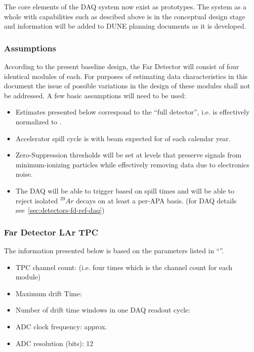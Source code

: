 The core elements of the DAQ system now exist as prototypes.
The system as a whole with capabilities such as descibed above is
in the conceptual design stage and information will be added to DUNE planning documents as it is developed.





\subsubsection{Assumptions}
\label{sec:detectors-sc-infrastructure-assumptions}
According to the present baseline design, the Far Detector will
consist of four identical modules of \tpcmodulemass each.  For
purposes of estimating data characteristics in this document the issue
of possible variations in the design of these modules shall not be
addressed. A few basic assumptions will need to be used:
\begin{itemize}
\item Estimates presented below correspond to the ``full detector'',
  i.e. is effectively normalized to \dunedetectormass.
\item Accelerator spill cycle is \beamspillcycle with beam expected
  for \beamrunfraction of each calendar year.
\item Zero-Suppression thresholds will be set at levels that preserve
  signals from minimum-ionizing particles while effectively removing
  data due to electronics noise.
\item The DAQ will be able to trigger based on spill times and will be
  able to reject isolated $^{39}Ar$ decays on at least a per-APA
  basis. (for DAQ details see~\ref{sec:detectors-fd-ref-daq})
\end{itemize}

\subsubsection{Far Detector LAr TPC}
The information presented below is based on the parameters listed in
``\anxrates''.
\begin{itemize}
\item TPC channel count: \dunenumberchannels (i.e. four times
  \daqchannelspermodule which is the channel count for each \tpcmodulemass module)
\item Maximum drift Time: \tpcdrifttime
\item Number of drift time windows in one DAQ readout cycle: \daqdriftsperreadout
\item ADC clock frequency: approx. \daqsamplerate
\item ADC resolution (bits): 12
\end{itemize}

